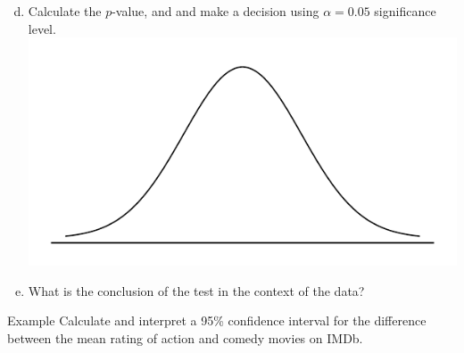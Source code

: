 \documentclass[11pt, fleqn]{beamer}\usepackage[]{graphicx}\usepackage[]{color}
\begin{document}
\begin{frame}
\small
\begin{enumerate}[(a)]
\setcounter{enumi}{3}
\item Calculate the $p$-value, and and make a decision using $\alpha = 0.05$ significance level.\\
\includegraphics[scale=0.4]{norm_draw.pdf}
\vspace{1cm}

\item What is the conclusion of the test in the context of the data?
\vspace{3cm}
\end{enumerate}
\end{frame}

\begin{frame}{Example}
Calculate and interpret a 95\% confidence interval for the difference between the mean rating of action and comedy movies on IMDb.
\vspace{7cm}
\end{frame}
\end{document}

